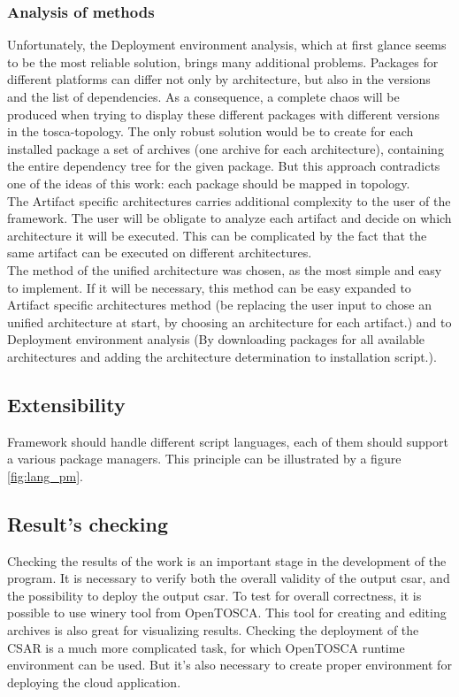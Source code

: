 \subsubsection*{Analysis of methods}
Unfortunately, the Deployment environment analysis, which at first glance seems to be the most reliable solution, brings many additional problems.
Packages for different platforms can differ not only by architecture, but also in the versions and the list of dependencies.
As a consequence, a complete chaos will be produced when trying to display these different packages with different versions in the \gls{tosca}-topology.
The only robust solution would be to create for each installed package a set of archives (one archive for each architecture), containing the entire dependency tree for the given package.
But this approach contradicts one of the ideas of this work: each package should be mapped in topology.\\
The Artifact specific architectures carries additional complexity to the user of the framework.
The user will be obligate to analyze each artifact and decide on which architecture it will be executed. 
This can be complicated by the fact that the same artifact can be executed on different architectures.\\
The method of the unified architecture was chosen, as the most simple and easy to implement.
If it will be necessary, this method can be easy expanded to Artifact specific architectures method (be replacing the user input to chose an unified architecture at start, by choosing an architecture for each artifact.) and to Deployment environment analysis (By downloading packages for all available architectures and adding the architecture determination to installation script.).

\subsection{Extensibility}
Framework should handle different script languages, each of them should support a various package managers.
This principle can be illustrated by a figure \ref{fig:lang_pm}.


\subsection{Result's checking}
Checking the results of the work is an important stage in the development of the program.
It is necessary to verify both the overall validity of the output \gls{csar}, and the possibility to deploy the output \gls{csar}.
To test for overall correctness, it is possible to use winery tool from OpenTOSCA.
This tool for creating and editing archives is also great for visualizing results.
Checking the deployment of the CSAR is a much more complicated task, for which OpenTOSCA runtime environment can be used. 
But it's also necessary to create proper environment for deploying the cloud application.

